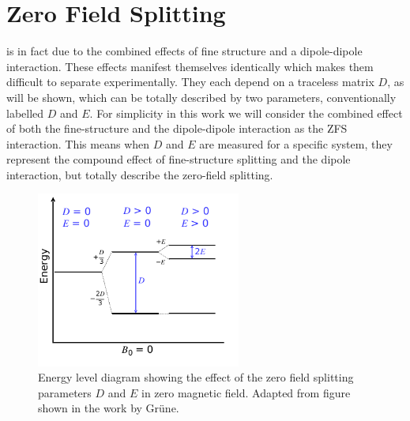 \section{Zero Field Splitting}\label{zfs}
 is in fact due to the combined effects of fine structure and a dipole-dipole interaction. These effects manifest themselves identically which makes them difficult to separate experimentally. They each depend on a traceless matrix $D$, as will be shown, which can be totally described by two parameters, conventionally labelled $D$ and $E$. 
For simplicity in this work we will consider the combined effect of both the fine-structure and the dipole-dipole interaction as the ZFS interaction. This means when $D$ and $E$ are measured for a specific system, they represent the compound effect of fine-structure splitting and the dipole interaction, but totally describe the zero-field splitting. 

\begin{figure}[H]
    \begin{center}
        \includegraphics[width=0.6\textwidth]{figures/ZFS.pdf}
    \end{center}
    \caption{Energy level diagram showing the effect of the zero field splitting parameters $D$ and $E$ in zero magnetic field. Adapted from figure shown in the work by Gr\"{u}ne. }\label{fig:ZFS}
\end{figure}



